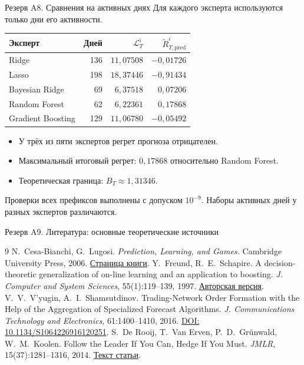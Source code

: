 \documentclass[11pt,aspectratio=169]{beamer}
\begin{document}
\begin{frame}{Резерв A8. Сравнения на активных днях}
  Для каждого эксперта используются только дни его активности.
  \begin{center}
\begin{tabular}{@{}lrrr@{}}
\toprule
Эксперт & Дней & $\mathcal L_T^i$ & $\widetilde R_{T,\mathrm{pred}}^i$ \\
\midrule
Ridge & 136 & $11{,}07508$ & $-0{,}01726$ \\
Lasso & 198 & $18{,}37446$ & $-0{,}91434$ \\
Bayesian Ridge & 69 & $6{,}37518$ & $0{,}07206$ \\
Random Forest & 62 & $6{,}22361$ & $0{,}17868$ \\
Gradient Boosting & 129 & $11{,}06780$ & $-0{,}05492$ \\
\bottomrule
\end{tabular}
  \end{center}
  \begin{itemize}
    \item У трёх из пяти экспертов регрет прогноза отрицателен.
    \item Максимальный итоговый регрет: $0{,}17868$ относительно Random Forest.
    \item Теоретическая граница: $B_T\approx1{,}31346$.
  \end{itemize}
  \par\vfill{\scriptsize Проверки всех префиксов выполнены с допуском $10^{-9}$. Наборы активных дней у разных экспертов различаются.\par}
\end{frame}

\begin{frame}{Резерв A9. Литература: основные теоретические источники}
  \small
  \begin{thebibliography}{9}
      N.~Cesa-Bianchi, G.~Lugosi.
      \emph{Prediction, Learning, and Games.}
      Cambridge University Press, 2006.
      \href{https://cesa-bianchi.di.unimi.it/predbook/}{Страница книги}.
      Y.~Freund, R.~E.~Schapire.
      A decision-theoretic generalization of on-line learning and an application to boosting.
      \emph{J. Computer and System Sciences}, 55(1):119--139, 1997.
      \href{https://www.schapire.net/papers/FreundSc95.pdf}{Авторская версия}.
      V.~V.~V'yugin, A.~I.~Shamsutdinov.
      Trading-Network Order Formation with the Help of the Aggregation of Specialized Forecast Algorithms.
      \emph{J. Communications Technology and Electronics}, 61:1400--1410, 2016.
      \href{https://doi.org/10.1134/S1064226916120251}{DOI: 10.1134/S1064226916120251}.
      S.~De Rooij, T.~Van Erven, P.~D.~Gr\"unwald, W.~M.~Koolen.
      Follow the Leader If You Can, Hedge If You Must.
      \emph{JMLR}, 15(37):1281--1316, 2014.
      \href{https://www.jmlr.org/papers/v15/rooij14a.html}{Текст статьи}.
  \end{thebibliography}
\end{frame}
\end{document}
